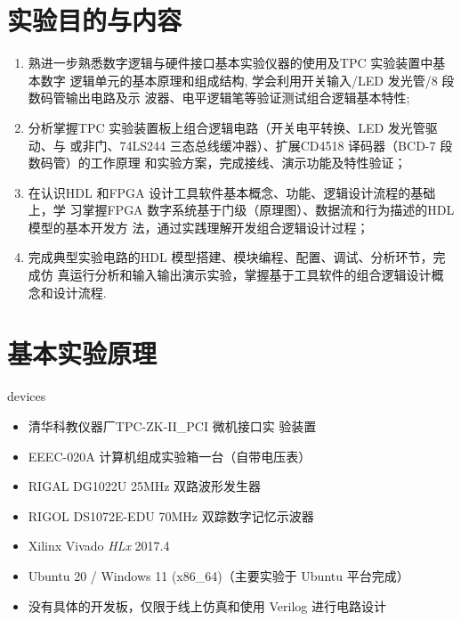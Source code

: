 \documentclass[11pt]{SEU-Digital-Report}
\begin{document}
    \exptitlepage

    \tableofcontents
    \newpage

    \section{实验目的与内容}
        
        \begin{enumerate}
            \item 熟进一步熟悉数字逻辑与硬件接口基本实验仪器的使用及TPC 实验装置中基本数字
            逻辑单元的基本原理和组成结构, 学会利用开关输入/LED 发光管/8 段数码管输出电路及示
            波器、电平逻辑笔等验证测试组合逻辑基本特性;
            \item 分析掌握TPC 实验装置板上组合逻辑电路（开关电平转换、LED 发光管驱动、与
            或非门、74LS244 三态总线缓冲器）、扩展CD4518 译码器（BCD-7 段数码管）的工作原理
            和实验方案，完成接线、演示功能及特性验证；
            \item 在认识HDL 和FPGA 设计工具软件基本概念、功能、逻辑设计流程的基础上，学
            习掌握FPGA 数字系统基于门级（原理图）、数据流和行为描述的HDL 模型的基本开发方
            法，通过实践理解开发组合逻辑设计过程；
            \item 完成典型实验电路的HDL 模型搭建、模块编程、配置、调试、分析环节，完成仿
            真运行分析和输入输出演示实验，掌握基于工具软件的组合逻辑设计概念和设计流程.
        \end{enumerate}

    \section{基本实验原理}

            \begin{device}{}{devices}
                \begin{itemize}
                    \item 清华科教仪器厂TPC-ZK-II\_PCI 微机接口实
                    验装置
                    \item EEEC-020A 计算机组成实验箱一台（自带电压表）
                    \item RIGAL DG1022U 25MHz 双路波形发生器
                    \item RIGOL DS1072E-EDU 70MHz 双踪数字记忆示波器
                    \item Xilinx Vivado \textit{HLx} 2017.4
                    \item Ubuntu 20 / Windows 11 (x86\_64){\kaishu\color{gray}（主要实验于 Ubuntu 平台完成）}
                    \item 没有具体的开发板，仅限于线上仿真和使用 Verilog 进行电路设计
                \end{itemize}
            \end{device}
\end{document}
